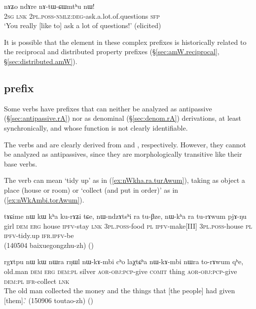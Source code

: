   \begin{exe}
\ex \label{ex:nAtWCWmthu}
\gll nɤʑo ndɤre nɤ-tɯ-ɕɯmtʰu nɯ! \\
\textsc{2sg} \textsc{lnk} \textsc{2pl}.\textsc{poss}-\textsc{nmlz}:\textsc{deg}-ask.a.lot.of.questions \textsc{sfp} \\
\glt `You really [like to] ask a lot of questions!' (elicited)
\end{exe}

It is possible that the  element in these complex prefixes is historically related to the  reciprocal and distributed property prefixes (§\ref{sec:amW.reciprocal}, §\ref{sec:distributed.amW}).


\subsection{ prefix} \label{sec:rA.non.apass}
Some verbs have  prefixes that can neither be analyzed as antipassive (§\ref{sec:antipassive.rA}) nor as denominal (§\ref{sec:denom.rA}) derivations, at least synchronically, and whose function is not clearly identifiable.

The verbs  and  are clearly derived from  and , respectively. However, they cannot be analyzed as antipassives, since they are morphologically transitive like their base verbs.

The verb  can mean `tidy up' as in (\ref{ex:nWkha.ra.turAwum}), taking as object a place (house or room) or `collect (and put in order)' as in (\ref{ex:nWkAmbi.torAwum}).

\begin{exe}
\ex \label{ex:nWkha.ra.turAwum}
\gll  tɤɕime nɯ kɯ kʰa ku-rɤʑi tɕe, nɯ-ndzɤtsʰi ra tu-βze, nɯ-kʰa ra tu-rɤwum pjɤ-ŋu \\
girl \textsc{dem} \textsc{erg} house \textsc{ipfv}-stay \textsc{lnk} \textsc{3pl}.\textsc{poss}-food \textsc{pl} \textsc{ipfv}-make[III]  \textsc{3pl}.\textsc{poss}-house \textsc{pl} \textsc{ipfv}-tidy.up \textsc{ifr}.\textsc{ipfv}-be \\
\glt (140504 baixuegongzhu-zh)
()
\end{exe}

\begin{exe}
\ex \label{ex:nWkAmbi.torAwum}
\gll rgɤtpu nɯ kɯ nɯra rŋɯl nɯ-kɤ-mbi cʰo laχtɕʰa nɯ-kɤ-mbi nɯra to-rɤwum qʰe, \\
old.man \textsc{dem} \textsc{erg} \textsc{dem}:\textsc{pl} silver \textsc{aor}-\textsc{obj}:\textsc{pcp}-give \textsc{comit} thing \textsc{aor}-\textsc{obj}:\textsc{pcp}-give \textsc{dem}:\textsc{pl} \textsc{ifr}-collect \textsc{lnk} \\
\glt  The old man collected the money and the things that [the people] had given [them].' (150906 toutao-zh)
()
\end{exe}

